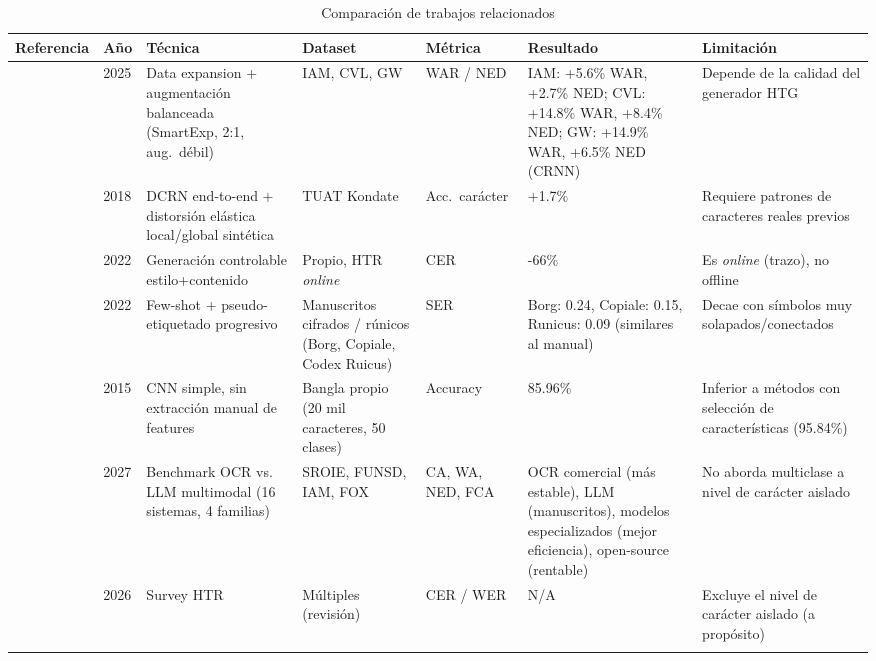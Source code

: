 \documentclass[conference]{IEEEtran}
\begin{document}
\begin{table}[p]
\centering
\caption{Comparación de trabajos relacionados}
\label{tab:comparativa}
\setlength{\tabcolsep}{3pt}
\small
\begin{tabular}{p{2.0cm}p{1.6cm}p{3.1cm}p{2.7cm}p{1.6cm}p{2.5cm}p{3.0cm}}
\toprule
\textbf{Referencia} & \textbf{Año} & \textbf{Técnica} & \textbf{Dataset} & \textbf{Métrica} & \textbf{Resultado} & \textbf{Limitación} \\
\midrule

\cite{wang_smartexp_2025} & 2025 &
Data expansion + augmentación balanceada (SmartExp, 2:1, aug.~débil) &
IAM, CVL, GW &
WAR / NED &
IAM: +5.6\% WAR, +2.7\% NED;
CVL: +14.8\% WAR, +8.4\% NED;
GW: +14.9\% WAR, +6.5\% NED (CRNN) &
Depende de la calidad del generador HTG \\
\addlinespace

\cite{ly_training_2018} & 2018 &
DCRN end-to-end + distorsión elástica local/global sintética &
TUAT Kondate &
Acc.\ carácter &
+1.7\% &
Requiere patrones de caracteres reales previos \\
\addlinespace

\cite{chang_data_2022} & 2022 &
Generación controlable estilo+contenido &
Propio, HTR \emph{online} &
CER &
-66\% &
Es \emph{online} (trazo), no offline \\
\addlinespace

\cite{souibgui_few_2022} & 2022 &
Few-shot + pseudo-etiquetado progresivo &
Manuscritos cifrados / rúnicos (Borg, Copiale, Codex Ruicus) &
SER &
Borg: 0.24, 
Copiale: 0.15,  
Runicus: 0.09 (similares al manual)  &
Decae con símbolos muy solapados/conectados \\
\addlinespace

\cite{bangla_cnn_2015} & 2015 &
CNN simple, sin extracción manual de features &
Bangla propio (20 mil caracteres, 50 clases) &
Accuracy &
85.96\% &
Inferior a métodos con selección de características (95.84\%) \\
\addlinespace

\cite{caravani_assessing_2027} & 2027 &
Benchmark OCR vs. LLM multimodal (16 sistemas, 4 familias) &
SROIE, FUNSD, IAM, FOX &
CA, WA, NED, FCA &
OCR comercial (más estable), LLM (manuscritos), modelos especializados (mejor eficiencia), open-source  (rentable) &
No aborda multiclase a nivel de carácter aislado \\
\addlinespace

\cite{garrido-munoz_handwritten_2026} & 2026 &
Survey HTR  &
Múltiples (revisión) &
CER / WER &
N/A &
Excluye el nivel de carácter aislado (a propósito) \\
\addlinespace


\end{tabular}
\end{table}
\end{document}
